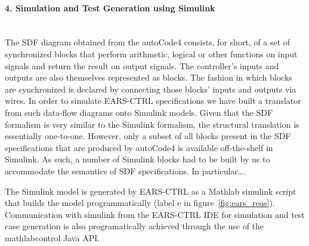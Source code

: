 \paragraph{4. Simulation and Test Generation using Simulink\\\\}

The SDF diagram obtained from the \textsf{autoCode4}
consists, for short, of a set of synchronized blocks that perform arithmetic,
logical or other functions on input signals and return the result on output signals. The controller's inputs and
outputs are also themselves represented as blocks. The fashion in which blocks
are synchronized is declared by connecting those blocks' inputs and outputs via
wires. In order to simulate \textsf{EARS-CTRL} specifications we have built a
translator from such data-flow diagrams onto Simulink models. Given that the SDF
formalism is very similar to the Simulink formalism, the structural translation
is essentially one-to-one. However, only a subset of all blocks present in
the SDF specifications that are produced by \textsf{autoCode4} is available
off-the-shelf in Simulink. As such, a number of Simulink blocks had to be built
by us to accommodate the semantics of SDF specifications. In
particular\ldots{}.

The Simulink model is generated by \textsf{EARS-CTRL} as a Mathlab simulink
script that builds the model programmatically (label \textsf{e} in
figure~\ref{fig:ears_reqs}). Communication with simulink from the \textsf{EARS-CTRL} IDE for
simulation and test case generation is also programatically achieved through the
use of the \textsf{mathlabcontrol}\cite{mathlabcontrol} Java API.
